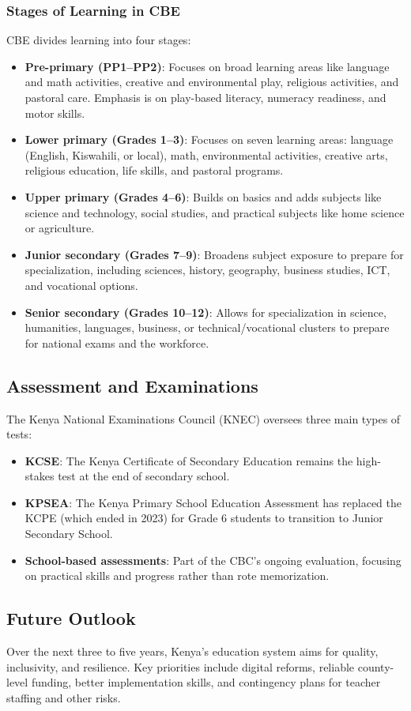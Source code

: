 \documentclass[12pt,a4paper]{article}
\begin{document}
\subsubsection*{Stages of Learning in CBE}
CBE divides learning into four stages:
\begin{itemize}
    \item \textbf{Pre-primary (PP1–PP2)}: Focuses on broad learning areas like language and math activities, creative and environmental play, religious activities, and pastoral care. Emphasis is on play-based literacy, numeracy readiness, and motor skills.
    \item \textbf{Lower primary (Grades 1–3)}: Focuses on seven learning areas: language (English, Kiswahili, or local), math, environmental activities, creative arts, religious education, life skills, and pastoral programs.
    \item \textbf{Upper primary (Grades 4–6)}: Builds on basics and adds subjects like science and technology, social studies, and practical subjects like home science or agriculture.
    \item \textbf{Junior secondary (Grades 7–9)}: Broadens subject exposure to prepare for specialization, including sciences, history, geography, business studies, ICT, and vocational options.
    \item \textbf{Senior secondary (Grades 10–12)}: Allows for specialization in science, humanities, languages, business, or technical/vocational clusters to prepare for national exams and the workforce.
\end{itemize}

\subsection*{Assessment and Examinations}
The Kenya National Examinations Council (KNEC) oversees three main types of tests:
\begin{itemize}
    \item \textbf{KCSE}: The Kenya Certificate of Secondary Education remains the high-stakes test at the end of secondary school.
    \item \textbf{KPSEA}: The Kenya Primary School Education Assessment has replaced the KCPE (which ended in 2023) for Grade 6 students to transition to Junior Secondary School.
    \item \textbf{School-based assessments}: Part of the CBC's ongoing evaluation, focusing on practical skills and progress rather than rote memorization.
\end{itemize}

\subsection*{Future Outlook}
Over the next three to five years, Kenya's education system aims for quality, inclusivity, and resilience. Key priorities include digital reforms, reliable county-level funding, better implementation skills, and contingency plans for teacher staffing and other risks.
\end{document}
